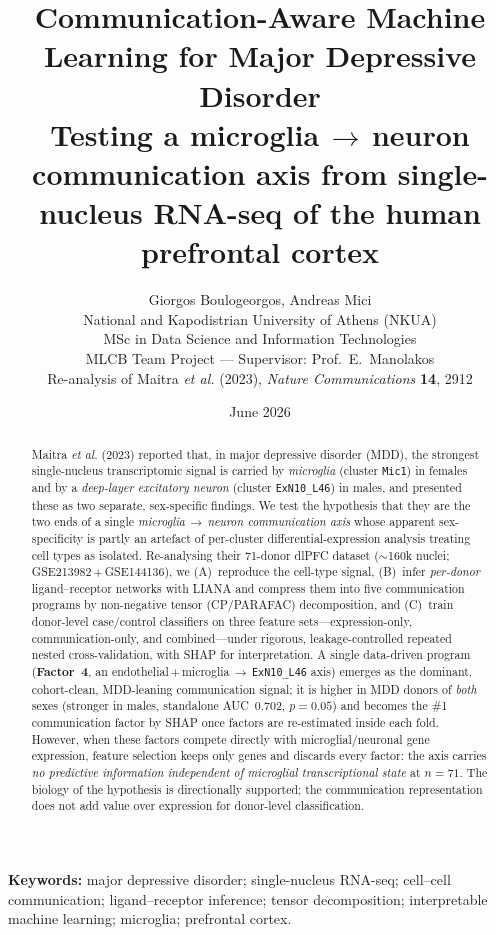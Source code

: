 \documentclass[11pt]{article}
\title{\textbf{Communication-Aware Machine Learning for Major Depressive
Disorder}\\[4pt]
\large Testing a microglia\,$\rightarrow$\,neuron communication axis from
single-nucleus RNA-seq of the human prefrontal cortex}
\author{Giorgos Boulogeorgos, Andreas Mici \\[4pt]
\small National and Kapodistrian University of Athens (NKUA) \\
\small MSc in Data Science and Information Technologies \\[3pt]
\small MLCB Team Project --- Supervisor: Prof.\ E.~Manolakos \\[2pt]
\small Re-analysis of Maitra \textit{et al.}
(2023), \textit{Nature Communications} \textbf{14}, 2912}
\date{June 2026}
\newcommand{\factorfour}{\textbf{Factor~4}}
\newcommand{\code}[1]{\texttt{\small #1}}
\begin{document}
\maketitle

\begin{abstract}
\noindent
Maitra \textit{et al.} (2023) reported that, in major depressive disorder
(MDD), the strongest single-nucleus transcriptomic signal is carried by
\emph{microglia} (cluster \code{Mic1}) in females and by a \emph{deep-layer
excitatory neuron} (cluster \code{ExN10\_L46}) in males, and presented these as
two separate, sex-specific findings. We test the hypothesis that they are the
two ends of a single \emph{microglia\,$\rightarrow$\,neuron communication axis}
whose apparent sex-specificity is partly an artefact of per-cluster
differential-expression analysis treating cell types as isolated. Re-analysing
their 71-donor dlPFC dataset ($\sim$160k nuclei; GSE213982\,+\,GSE144136), we
(A)~reproduce the cell-type signal, (B)~infer \emph{per-donor} ligand--receptor
networks with LIANA and compress them into five communication programs by
non-negative tensor (CP/PARAFAC) decomposition, and (C)~train donor-level
case/control classifiers on three feature sets---expression-only,
communication-only, and combined---under rigorous, leakage-controlled repeated
nested cross-validation, with SHAP for interpretation. A single data-driven
program (\factorfour, an \mbox{endothelial\,+\,microglia\,$\rightarrow$\,}\code{ExN10\_L46}
axis) emerges as the dominant, cohort-clean, MDD-leaning communication signal;
it is higher in MDD donors of \emph{both} sexes (stronger in males, standalone
AUC~0.702, $p=0.05$) and becomes the \#1 communication factor by SHAP once
factors are re-estimated inside each fold. However, when these factors compete
directly with microglial/neuronal gene expression, feature selection keeps only
genes and discards every factor: the axis carries \emph{no predictive
information independent of microglial transcriptional state} at $n=71$. The
biology of the hypothesis is directionally supported; the communication
representation does not add value over expression for donor-level
classification.
\end{abstract}

\medskip
\noindent\textbf{Keywords:} major depressive disorder; single-nucleus RNA-seq;
cell--cell communication; ligand--receptor inference; tensor decomposition;
interpretable machine learning; microglia; prefrontal cortex.
\bigskip

\end{document}
